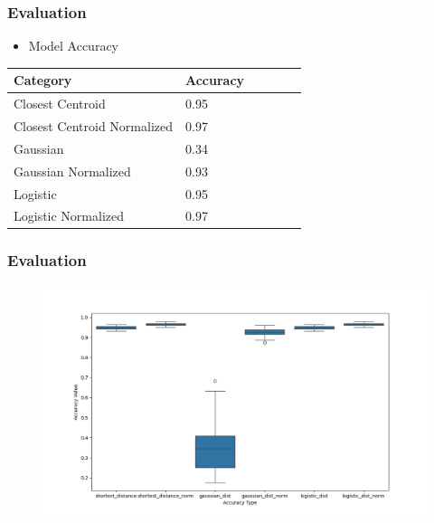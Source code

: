 \documentclass[
  10pt %
  16:9, %
]{beamer}
\begin{document}
\begin{frame}
  \frametitle{Evaluation}
  \begin{itemize}
    \item Model Accuracy
  \end{itemize}
  \begin{table}
    \centering
    \begin{tabular}{@{}llllll@{}}
        \toprule
        Category       & Accuracy\\ \midrule
        Closest Centroid       & 0.95\\
        Closest Centroid Normalized  & 0.97\\
        Gaussian       &0.34 \\
        Gaussian Normalized          &0.93 \\
        Logistic           &0.95 \\
        Logistic Normalized           &0.97 \\
        \bottomrule
    \end{tabular}
  \end{table}
\end{frame}

\begin{frame}
  \frametitle{Evaluation}
  \begin{figure}
    \centering
    \includegraphics[width=1\textwidth]{error_map.png}
  \end{figure}
\end{frame}
\end{document}
